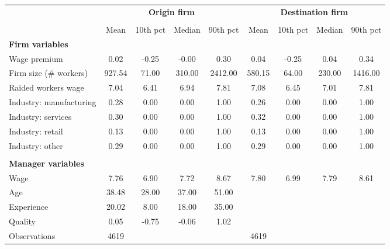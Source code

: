 {
\def\sym#1{\ifmmode^{#1}\else\(^{#1}\)\fi}
\begin{tabular}{l*{2}{cccc}}
\toprule
                    &\multicolumn{4}{c}{\textbf{Origin firm}}           &\multicolumn{4}{c}{\textbf{Destination firm}}      \\\cmidrule(lr){2-5}\cmidrule(lr){6-9}
                    &\multicolumn{4}{c}{}                               &\multicolumn{4}{c}{}                               \\
                    &        Mean&    10th pct&      Median&    90th pct&        Mean&    10th pct&      Median&    90th pct\\
\midrule
\textbf{Firm variables}&            &            &            &            &            &            &            &            \\
Wage premium        &        0.02&       -0.25&       -0.00&        0.30&        0.04&       -0.25&        0.04&        0.34\\
Firm size (\# workers)&      927.54&       71.00&      310.00&     2412.00&      580.15&       64.00&      230.00&     1416.00\\
Raided workers wage &        7.04&        6.41&        6.94&        7.81&        7.08&        6.45&        7.01&        7.81\\
Industry: manufacturing&        0.28&        0.00&        0.00&        1.00&        0.26&        0.00&        0.00&        1.00\\
Industry: services  &        0.30&        0.00&        0.00&        1.00&        0.32&        0.00&        0.00&        1.00\\
Industry: retail    &        0.13&        0.00&        0.00&        1.00&        0.13&        0.00&        0.00&        1.00\\
Industry: other     &        0.29&        0.00&        0.00&        1.00&        0.29&        0.00&        0.00&        1.00\\
\\ \textbf{Manager variables}&            &            &            &            &            &            &            &            \\
Wage                &        7.76&        6.90&        7.72&        8.67&        7.80&        6.99&        7.79&        8.61\\
Age                 &       38.48&       28.00&       37.00&       51.00&            &            &            &            \\
Experience          &       20.02&        8.00&       18.00&       35.00&            &            &            &            \\
Quality             &        0.05&       -0.75&       -0.06&        1.02&            &            &            &            \\
\midrule
Observations        &        4619&            &            &            &        4619&            &            &            \\
\bottomrule
\end{tabular}
}
